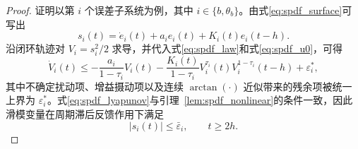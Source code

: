 \begin{proof}
证明以第 $i$ 个误差子系统为例，其中 $i\in\{b,\theta_b\}$。由式\eqref{eq:spdf_surface}可写出
\begin{equation}
s_i(t)=\dot e_i(t)+a_i e_i(t)+K_i(t)e_i(t-h).
\label{eq:spdf_si_repeat}
\end{equation}
沿闭环轨迹对 $V_i=s_i^2/2$ 求导，并代入式\eqref{eq:spdf_law}和式\eqref{eq:spdf_u0}，可得
\begin{equation}
\dot V_i(t)\leq
-\frac{a_i}{1-\tau_i}V_i(t)
-\frac{K_i(t)}{1-\tau_i}V_i^{\tau_i}(t)V_i^{1-\tau_i}(t-h)
+\varepsilon_i^{\ast},
\label{eq:spdf_lyapunov}
\end{equation}
其中不确定扰动项、增益摄动项以及连续 $\arctan(\cdot)$ 近似带来的残余项被统一上界为 $\varepsilon_i^\ast$。式\eqref{eq:spdf_lyapunov}与引理~\ref{lem:spdf_nonlinear}的条件一致，因此滑模变量在周期滞后反馈作用下满足
\begin{equation}
|s_i(t)|\leq \bar\varepsilon_i,\qquad t\geq 2h.
\label{eq:spdf_s_bound}
\end{equation}


\end{proof}
